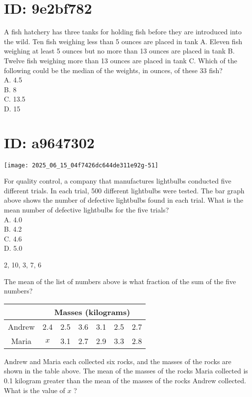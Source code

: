 \section*{ID: 9e2bf782}
A fish hatchery has three tanks for holding fish before they are introduced into the wild. Ten fish weighing less than 5 ounces are placed in tank A. Eleven fish weighing at least 5 ounces but no more than 13 ounces are placed in tank B. Twelve fish weighing more than 13 ounces are placed in tank C. Which of the following could be the median of the weights, in ounces, of these 33 fish?\\
A. 4.5\\
B. 8\\
C. 13.5\\
D. 15

\section*{ID: a9647302}
\begin{center}
\texttt{[image: 2025\_06\_15\_04f7426dc644de311e92g-51]}
\end{center}

For quality control, a company that manufactures lightbulbs conducted five different trials. In each trial, 500 different lightbulbs were tested. The bar graph above shows the number of defective lightbulbs found in each trial. What is the mean number of defective lightbulbs for the five trials?\\
A. 4.0\\
B. 4.2\\
C. 4.6\\
D. 5.0

2, 10, 3, 7, 6

The mean of the list of numbers above is what fraction of the sum of the five numbers?

\begin{center}
\begin{tabular}{|c|c|c|c|c|c|c|}
\hline
 & \multicolumn{6}{|c|}{Masses (kilograms)} \\
\hline
Andrew & 2.4 & 2.5 & 3.6 & 3.1 & 2.5 & 2.7 \\
\hline
Maria & $x$ & 3.1 & 2.7 & 2.9 & 3.3 & 2.8 \\
\hline
\end{tabular}
\end{center}

Andrew and Maria each collected six rocks, and the masses of the rocks are shown in the table above. The mean of the masses of the rocks Maria collected is 0.1 kilogram greater than the mean of the masses of the rocks Andrew collected. What is the value of $x$ ?


